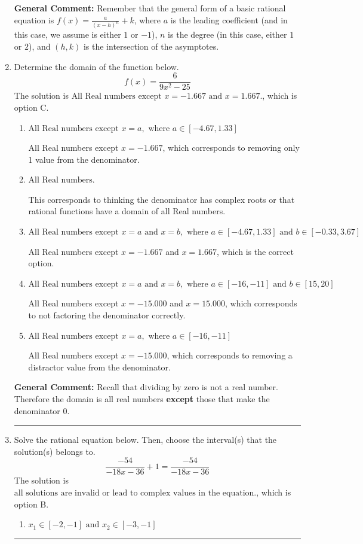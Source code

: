 \documentclass{extbook}[14pt]
\newcommand{\litem}[1]{\item #1

\rule{\textwidth}{0.4pt}}
\begin{document}
\begin{enumerate}
{\textbf{General Comment:} Remember that the general form of a basic rational equation is $ f(x) = \frac{a}{(x-h)^n} + k$, where $a$ is the leading coefficient (and in this case, we assume is either $1$ or $-1$), $n$ is the degree (in this case, either $1$ or $2$), and $(h, k)$ is the intersection of the asymptotes.
}
\litem{
Determine the domain of the function below.
\[ f(x) = \frac{6}{9x^{2} -25} \]The solution is \( \text{All Real numbers except } x = -1.667 \text{ and } x = 1.667. \), which is option C.\begin{enumerate}[label=\Alph*.]
\item \( \text{All Real numbers except } x = a, \text{ where } a \in [-4.67, 1.33] \)

All Real numbers except $x = -1.667$, which corresponds to removing only 1 value from the denominator.
\item \( \text{All Real numbers.} \)

This corresponds to thinking the denominator has complex roots or that rational functions have a domain of all Real numbers.
\item \( \text{All Real numbers except } x = a \text{ and } x = b, \text{ where } a \in [-4.67, 1.33] \text{ and } b \in [-0.33, 3.67] \)

All Real numbers except $x = -1.667$ and $x = 1.667$, which is the correct option.
\item \( \text{All Real numbers except } x = a \text{ and } x = b, \text{ where } a \in [-16, -11] \text{ and } b \in [15, 20] \)

All Real numbers except $x = -15.000$ and $x = 15.000$, which corresponds to not factoring the denominator correctly.
\item \( \text{All Real numbers except } x = a, \text{ where } a \in [-16, -11] \)

All Real numbers except $x = -15.000$, which corresponds to removing a distractor value from the denominator.
\end{enumerate}

\textbf{General Comment:} Recall that dividing by zero is not a real number. Therefore the domain is all real numbers \textbf{except} those that make the denominator 0.
}
\litem{
Solve the rational equation below. Then, choose the interval(s) that the solution(s) belongs to.
\[ \frac{-54}{-18x -36} + 1 = \frac{-54}{-18x -36} \]The solution is \( \text{all solutions are invalid or lead to complex values in the equation.} \), which is option B.\begin{enumerate}[label=\Alph*.]
\item \( x_1 \in [-2, -1] \text{ and } x_2 \in [-3,-1] \)


\end{enumerate}}
\end{enumerate}
\end{document}
